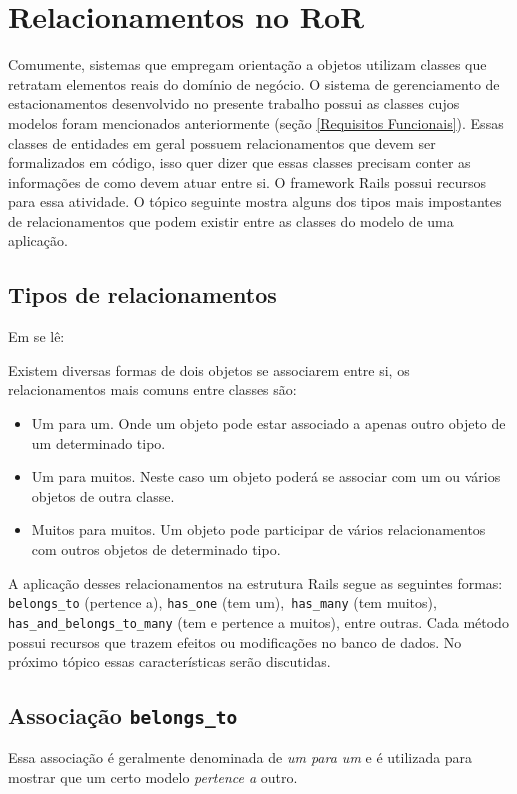 \section{Relacionamentos no RoR}
Comumente, sistemas que empregam orientação a objetos utilizam classes que retratam elementos reais do domínio de negócio. O sistema de gerenciamento de estacionamentos desenvolvido no presente trabalho possui as classes cujos modelos foram mencionados anteriormente (seção \ref{Requisitos Funcionais}). Essas classes de entidades em geral possuem relacionamentos que devem ser formalizados em código, isso quer dizer que essas classes precisam conter as informações de como devem atuar entre si. O framework Rails possui recursos para essa atividade. O tópico seguinte mostra alguns dos tipos mais impostantes de relacionamentos que podem existir entre as classes do modelo de uma aplicação.
\subsection{Tipos de relacionamentos}
Em \cite{relacionamentos2015} se lê:
\begin{citacao}
	
	Existem diversas formas de dois objetos se associarem entre si, os relacionamentos mais comuns entre classes são:
	\begin{itemize}
		
		\item Um para um. Onde um objeto pode estar associado a apenas outro objeto de um determinado tipo.
		\item Um para muitos. Neste caso um objeto poderá se associar com um ou vários objetos de outra classe.
		\item Muitos para muitos. Um objeto pode participar de vários relacionamentos com outros objetos de determinado tipo.
	\end{itemize}
\end{citacao}

A aplicação desses relacionamentos na estrutura Rails segue as seguintes formas: \texttt{belongs\_to} (pertence a), \texttt{has\_one} (tem um),\texttt{ has\_many} (tem muitos), \texttt{has\_and\_belongs\_to\_many} (tem e pertence a muitos), entre outras. Cada  método possui recursos que trazem efeitos ou modificações no banco de dados. No próximo tópico essas características serão discutidas.


\subsection{Associação \texttt{belongs\_to}}
Essa associação é geralmente denominada de \textit{um para um} e é utilizada para mostrar que um certo modelo \textit{pertence a} outro.

